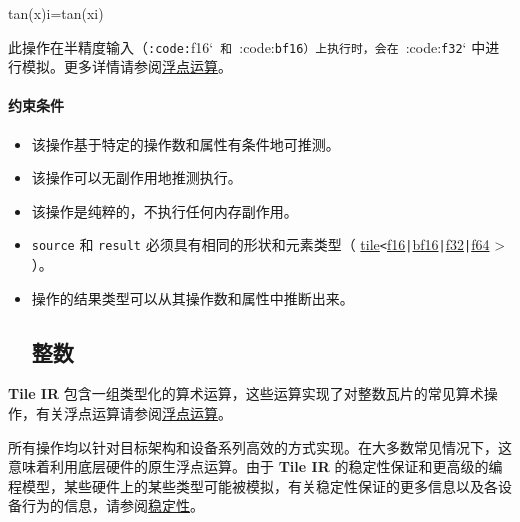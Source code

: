 \documentclass{article}
\begin{document}
tan(x)i=tan(xi)


此操作在半精度输入（\texttt{:code:}f16`\texttt{ 和 }:code:\texttt{bf16}\texttt{）上执行时，会在 }:code:\texttt{f32}` 中进行模拟。更多详情请参阅\href{https://docs.nvidia.com/cuda/tile-ir/latest/sections/operations.html#op-group-floating-point}{浮点运算}。





\paragraph{约束条件}


\begin{itemize}
\item 该操作基于特定的操作数和属性有条件地可推测。
\item 该操作可以无副作用地推测执行。
\item 该操作是纯粹的，不执行任何内存副作用。
\item \texttt{source} 和 \texttt{result} 必须具有相同的形状和元素类型（ \href{https://docs.nvidia.com/cuda/tile-ir/latest/sections/types.html#type-tile}{tile}\texttt{<}\href{https://docs.nvidia.com/cuda/tile-ir/latest/sections/types.html#subsection-element-types}{f16}\texttt{|}\href{https://docs.nvidia.com/cuda/tile-ir/latest/sections/types.html#subsection-element-types}{bf16}\texttt{|}\href{https://docs.nvidia.com/cuda/tile-ir/latest/sections/types.html#subsection-element-types}{f32}\texttt{|}\href{https://docs.nvidia.com/cuda/tile-ir/latest/sections/types.html#subsection-element-types}{f64} > ）。
\item 操作的结果类型可以从其操作数和属性中推断出来。






\subsection{整数}


\end{itemize}
\textbf{Tile IR} 包含一组类型化的算术运算，这些运算实现了对整数瓦片的常见算术操作，有关浮点运算请参阅\href{https://docs.nvidia.com/cuda/tile-ir/latest/sections/operations.html#op-group-floating-point}{浮点运算}。



所有操作均以针对目标架构和设备系列高效的方式实现。在大多数常见情况下，这意味着利用底层硬件的原生浮点运算。由于 \textbf{Tile IR} 的稳定性保证和更高级的编程模型，某些硬件上的某些类型可能被模拟，有关稳定性保证的更多信息以及各设备行为的信息，请参阅\href{https://docs.nvidia.com/cuda/tile-ir/latest/sections/stability.html#section-stability}{稳定性}。
\end{document}

